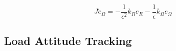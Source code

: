 \begin{equation}\label{key}
J\dot{e}_\Omega=-\frac{1}{\epsilon^2}k_Re_R-\frac{1}{\epsilon}k_\Omega e_\Omega
\end{equation} 

\subsection{Load Attitude Tracking}\label{sec:con.loadatt}





